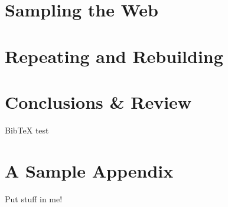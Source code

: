 \documentclass[11pt,oneside,a4paper,onecolumn,titlepage]{lancsthesis}
\begin{document}
\chapter{Sampling the Web}



\chapter{Repeating and Rebuilding}



\chapter{Conclusions \& Review}


BibTeX test \cite{Ahlberg94visualinformation}


\pagebreak

\backmatter



\pagebreak
\appendix
{}


\chapter{A Sample Appendix}
Put stuff in me!


\end{document}
